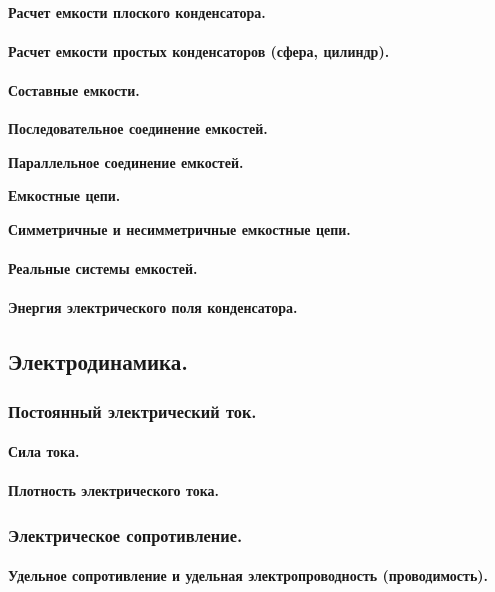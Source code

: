 \documentclass{article}
\begin{document}
            \paragraph{Расчет емкости плоского конденсатора.}
            \paragraph{Расчет емкости простых конденсаторов (сфера, цилиндр).}
            \paragraph{Составные емкости.}
                \textbf{Последовательное соединение емкостей.}

                \textbf{Параллельное соединение емкостей.}

                \textbf{Емкостные цепи.}

                \textbf{Симметричные и несимметричные емкостные цепи.}
                
            \paragraph{Реальные системы емкостей.}
            \paragraph{Энергия электрического поля конденсатора.}
        \subsection{Электродинамика.}
        \subsubsection{Постоянный электрический ток.}
            \paragraph{Сила тока.}
            \paragraph{Плотность электрического тока.}
        \subsubsection{Электрическое сопротивление.}
            \paragraph{Удельное сопротивление и удельная электропроводность (проводимость).}
\end{document}
